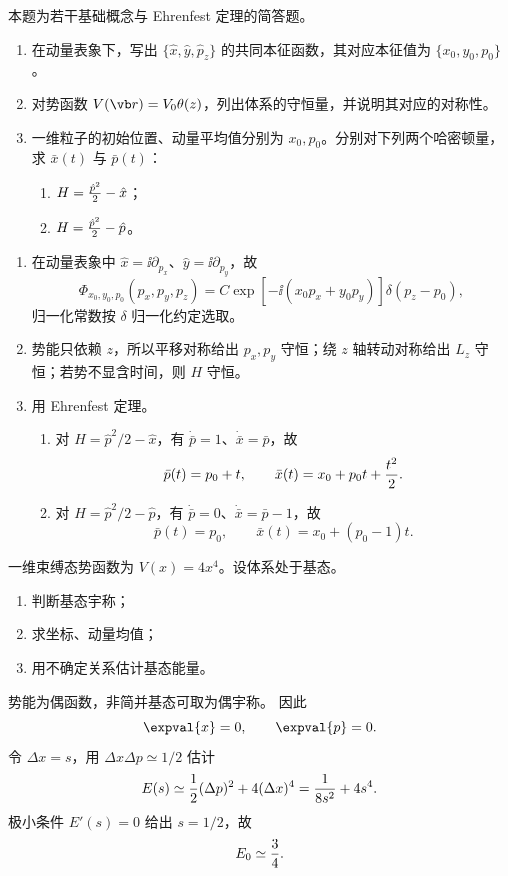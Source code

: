 
\begin{question}
本题为若干基础概念与 Ehrenfest 定理的简答题。
\begin{enumerate}
  \item 在动量表象下，写出 $\{\hat x,\hat y,\hat p_z\}$ 的共同本征函数，其对应本征值为 $\{x_0,y_0,p_0\}$。
  \item 对势函数 $V(\vb r)=V_0\theta(z)$，列出体系的守恒量，并说明其对应的对称性。
  \item 一维粒子的初始位置、动量平均值分别为 $x_0,p_0$。分别对下列两个哈密顿量，求 $\bar x(t)$ 与 $\bar p(t)$：
  \begin{enumerate}
    \item $H={\hat p^2\over 2}-\hat x$；
    \item $H={\hat p^2\over 2}-\hat p$。
  \end{enumerate}
\end{enumerate}
\begin{solution}
\begin{enumerate}
  \item 在动量表象中 $\hat x=\ii\partial_{p_x}$、$\hat y=\ii\partial_{p_y}$，故
  \[
    \Phi_{x_0,y_0,p_0}(p_x,p_y,p_z)=C\exp[-\ii(x_0p_x+y_0p_y)]\delta(p_z-p_0),
  \]
  归一化常数按 $\delta$ 归一化约定选取。
  \item 势能只依赖 $z$，所以平移对称给出 $p_x,p_y$ 守恒；绕 $z$ 轴转动对称给出 $L_z$ 守恒；若势不显含时间，则 $H$ 守恒。
  \item 用 Ehrenfest 定理。
  \begin{enumerate}
    \item 对 $H={\hat p^2/2}-\hat x$，有 $\dot{\bar p}=1$、$\dot{\bar x}=\bar p$，故
    \[
      \bar p(t)=p_0+t,
      \qquad \bar x(t)=x_0+p_0t+{t^2\over 2}.
    \]
    \item 对 $H={\hat p^2/2}-\hat p$，有 $\dot{\bar p}=0$、$\dot{\bar x}=\bar p-1$，故
    \[
      \bar p(t)=p_0,
      \qquad \bar x(t)=x_0+(p_0-1)t.
    \]
  \end{enumerate}
\end{enumerate}
\end{solution}
\end{question}

\begin{question}
一维束缚态势函数为 $V(x)=4x^4$。设体系处于基态。
\begin{enumerate}
  \item 判断基态宇称；
  \item 求坐标、动量均值；
  \item 用不确定关系估计基态能量。
\end{enumerate}
\begin{solution}
势能为偶函数，非简并基态可取为偶宇称。
因此
\[
  \expval{x}=0,
  \qquad \expval{p}=0 .
\]
令 $\Delta x=s$，用 $\Delta x\Delta p\simeq 1/2$ 估计
\[
  E(s)\simeq {1\over 2}(\Delta p)^2+4(\Delta x)^4
  ={1\over 8s^2}+4s^4.
\]
极小条件 $E'(s)=0$ 给出 $s=1/2$，故
\[
  E_0\simeq {3\over 4}.
\]
\end{solution}
\end{question}

